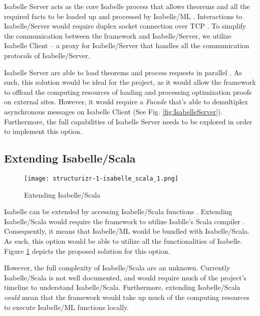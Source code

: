 Isabelle Server acts as the core Isabelle process that allows theorems and all the required facts to be loaded up and processed by Isabelle/ML
\cite[Ch. 4]{isabelleSystem}. Interactions to Isabelle/Server would require duplex socket connection over TCP \cite[Ch. 4.2]{isabelleSystem}. 
To simplify the communication between the framework and Isabelle/Server, we utilize Isabelle Client \cite[Ch. 4.1.2]{isabelleSystem} -- a proxy 
for Isabelle/Server that handles all the communication protocols of Isabelle/Server.

Isabelle Server are able to load theorems and process requests in parallel \cite[Ch. 4.2.6]{isabelleSystem}. As such, this solution would be ideal 
for the project, as it would allow the framework to offload the computing resources of loading and processing optimization proofs on external sites.
However, it would require a \emph{Facade} that's able to demultiplex asynchronous messages on Isabelle Client (See Fig. \ref{fig:IsabelleServer}). 
Furthermore, the full capabilities of Isabelle Server needs to be explored in order to implement this option.

\subsection{Extending Isabelle/Scala}
\label{sec:IsabelleScala}

\begin{figure}[h]
      \centering
      \texttt{[image: structurizr-1-isabelle\_scala\_1.png]}
      \caption{Extending Isabelle/Scala}
      \label{fig:IsabelleScala}
\end{figure}

Isabelle can be extended by accessing Isabelle/Scala functions \cite[Ch. 5]{isabelleSystem}. Extending Isabelle/Scala would require the framework 
to utilize Isablle's Scala compiler \cite[Ch. 5.1.4]{isabelleSystem}. Consequently, it means that Isabelle/ML would be bundled with Isabelle/Scala. 
As such, this option would be able to utilize all the functionalities of Isabelle. Figure \ref{fig:IsabelleScala} depicts the proposed solution for 
this option.

However, the full complexity of Isabelle/Scala are an unknown. Currently Isabelle/Scala is not well documented, and would require much of the 
project's timeline to understand Isabelle/Scala. Furthermore, extending Isabelle/Scala \emph{could} mean that the framework would take up 
much of the computing resources to execute Isabelle/ML functions locally.

